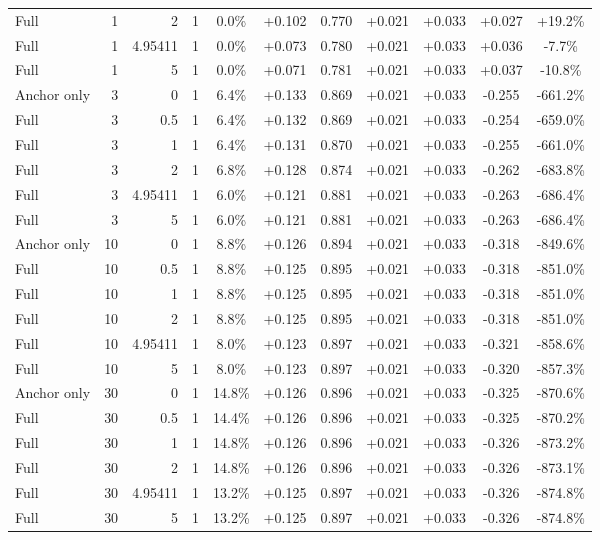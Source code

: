 \begin{table}[htbp]
\begin{tabular}{lrrrccccccc}
Full & 1 & 2 & 1 & 0.0\% & +0.102 & 0.770 & +0.021 & +0.033 & +0.027 & +19.2\% \\
Full & 1 & 4.95411 & 1 & 0.0\% & +0.073 & 0.780 & +0.021 & +0.033 & +0.036 & -7.7\% \\
Full & 1 & 5 & 1 & 0.0\% & +0.071 & 0.781 & +0.021 & +0.033 & +0.037 & -10.8\% \\
Anchor only & 3 & 0 & 1 & 6.4\% & +0.133 & 0.869 & +0.021 & +0.033 & -0.255 & -661.2\% \\
Full & 3 & 0.5 & 1 & 6.4\% & +0.132 & 0.869 & +0.021 & +0.033 & -0.254 & -659.0\% \\
Full & 3 & 1 & 1 & 6.4\% & +0.131 & 0.870 & +0.021 & +0.033 & -0.255 & -661.0\% \\
Full & 3 & 2 & 1 & 6.8\% & +0.128 & 0.874 & +0.021 & +0.033 & -0.262 & -683.8\% \\
Full & 3 & 4.95411 & 1 & 6.0\% & +0.121 & 0.881 & +0.021 & +0.033 & -0.263 & -686.4\% \\
Full & 3 & 5 & 1 & 6.0\% & +0.121 & 0.881 & +0.021 & +0.033 & -0.263 & -686.4\% \\
Anchor only & 10 & 0 & 1 & 8.8\% & +0.126 & 0.894 & +0.021 & +0.033 & -0.318 & -849.6\% \\
Full & 10 & 0.5 & 1 & 8.8\% & +0.125 & 0.895 & +0.021 & +0.033 & -0.318 & -851.0\% \\
Full & 10 & 1 & 1 & 8.8\% & +0.125 & 0.895 & +0.021 & +0.033 & -0.318 & -851.0\% \\
Full & 10 & 2 & 1 & 8.8\% & +0.125 & 0.895 & +0.021 & +0.033 & -0.318 & -851.0\% \\
Full & 10 & 4.95411 & 1 & 8.0\% & +0.123 & 0.897 & +0.021 & +0.033 & -0.321 & -858.6\% \\
Full & 10 & 5 & 1 & 8.0\% & +0.123 & 0.897 & +0.021 & +0.033 & -0.320 & -857.3\% \\
Anchor only & 30 & 0 & 1 & 14.8\% & +0.126 & 0.896 & +0.021 & +0.033 & -0.325 & -870.6\% \\
Full & 30 & 0.5 & 1 & 14.4\% & +0.126 & 0.896 & +0.021 & +0.033 & -0.325 & -870.2\% \\
Full & 30 & 1 & 1 & 14.8\% & +0.126 & 0.896 & +0.021 & +0.033 & -0.326 & -873.2\% \\
Full & 30 & 2 & 1 & 14.8\% & +0.126 & 0.896 & +0.021 & +0.033 & -0.326 & -873.1\% \\
Full & 30 & 4.95411 & 1 & 13.2\% & +0.125 & 0.897 & +0.021 & +0.033 & -0.326 & -874.8\% \\
Full & 30 & 5 & 1 & 13.2\% & +0.125 & 0.897 & +0.021 & +0.033 & -0.326 & -874.8\% \\

\end{tabular}
\end{table}
